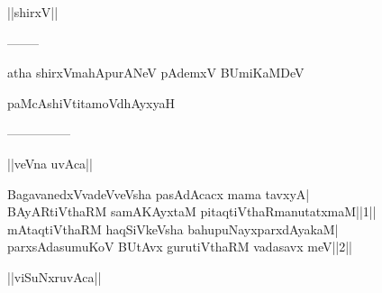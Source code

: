 \documentclass{article}
\begin{document}
\begin{center}
||shirxV||
\end{center}

\begin{center}
--------
\end{center}

\begin{center}
atha shirxVmahApurANeV pAdemxV BUmiKaMDeV
\end{center}

\begin{center}
paMcAshiVtitamoVdhAyxyaH
\end{center}

\begin{center}
---------------
\end{center}

\begin{center}
||veVna uvAca||
\end{center}

BagavanedxVvadeVveVsha pasAdAcacx mama tavxyA|\\
BAyARtiVthaRM samAKAyxtaM pitaqtiVthaRmanutatxmaM||1||\\
mAtaqtiVthaRM haqSiVkeVsha bahupuNayxparxdAyakaM|\\
parxsAdasumuKoV BUtAvx gurutiVthaRM vadasavx meV||2||\\

\begin{center}
||viSuNxruvAca||
\end{center}
\end{document}
